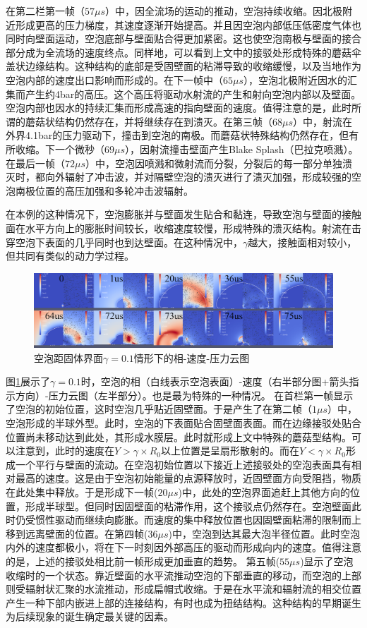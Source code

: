 在第二栏第一帧（$57\mu s$）中，因全流场的运动的推动，空泡持续收缩。因北极附近形成更高的压力梯度，其速度逐渐开始提高。并且因空泡内部低压低密度气体也同时向壁面运动，空泡底部与壁面贴合得更加紧密。这也使空泡南极与壁面的接合部分成为全流场的速度终点。同样地，可以看到上文中的接驳处形成特殊的蘑菇伞盖状边缘结构。这种结构的底部是受固壁面的粘滞导致的收缩缓慢，以及当地作为空泡内部的速度出口影响而形成的。在下一帧中（$65\mu s$），空泡北极附近因水的汇集而产生约4bar的高压。这个高压将驱动水射流的产生和射向空泡内部以及壁面。空泡内部也因水的持续汇集而形成高速的指向壁面的速度。值得注意的是，此时所谓的蘑菇状结构仍然存在，并将继续存在到溃灭。在第三帧（$68\mu s$）中，射流在外界4.1bar的压力驱动下，撞击到空泡的南极。而蘑菇状特殊结构仍然存在，但有所收缩。下一个微秒（$69\mu s$），因射流撞击壁面产生Blake Splash\cite{blake_art_1997, blake_acoustic_1999}（巴拉克喷溅）。在最后一帧（$72\mu s$）中，空泡因喷溅和微射流而分裂，分裂后的每一部分单独溃灭时，都向外辐射了冲击波，并对隔壁空泡的溃灭进行了溃灭加强，形成较强的空泡南极位置的高压加强和多轮冲击波辐射。

在本例的这种情况下，空泡膨胀并与壁面发生贴合和黏连，导致空泡与壁面的接触面在水平方向上的膨胀时间较长，收缩速度较慢，形成特殊的溃灭结构。射流在击穿空泡下表面的几乎同时也到达壁面。在这种情况中，$\gamma$越大，接触面相对较小，但共同有类似的动力学过程。


\begin{figure}[h]
    \centering
    \includegraphics[width=0.9\linewidth]{img/3.solid0.1.png}
    \caption{空泡距固体界面$\gamma=0.1$情形下的相-速度-压力云图}
    \label{fig3.gamma0.1}
\end{figure}

图\ref{fig3.gamma0.1}展示了$\gamma=0.1$时，空泡的相（白线表示空泡表面）-速度（右半部分图+箭头指示方向）-压力云图（左半部分）。也是最为特殊的一种情况。
在首栏第一帧显示了空泡的初始位置，这时空泡几乎贴近固壁面。于是产生了在第二帧（$ 1\mu s$）中，空泡形成的半球外型。此时，空泡的下表面贴合固壁面表面。而在边缘接驳处贴合位置尚未移动达到此处，其形成水膜层。此时就形成上文中特殊的蘑菇型结构。可以注意到，此时的速度在$Y>\gamma \times R_0$以上位置是呈扇形散射的。而在$Y<\gamma \times R_0$形成一个平行与壁面的流动。在空泡初始位置以下接近上述接驳处的空泡表面具有相对最高的速度。这是由于空泡初始能量的点源释放时，近固壁面方向受阻挡，物质在此处集中释放。于是形成下一帧($20\mu s$)中，此处的空泡界面追赶上其他方向的位置，形成半球型。但同时因固壁面的粘滞作用，这个接驳点仍然存在。空泡壁面此时仍受惯性驱动而继续向膨胀。而速度的集中释放位置也因固壁面粘滞的限制而上移到远离壁面的位置。在第四帧($36\mu s$)中，空泡到达其最大泡半径位置。此时空泡内外的速度都极小，将在下一时刻因外部高压的驱动而形成向内的速度。值得注意的是，上述的接驳处相比前一帧形成更加垂直的趋势。
第五帧($55\mu s$)显示了空泡收缩时的一个状态。靠近壁面的水平流推动空泡的下部垂直的移动，而空泡的上部则受辐射状汇聚的水流推动，形成扁帽式收缩。于是在水平流和辐射流的相交位置产生一种下部内嵌进上部的连接结构，有时也成为扭结结构。这种结构的早期诞生为后续现象的诞生确定最关键的因素。

